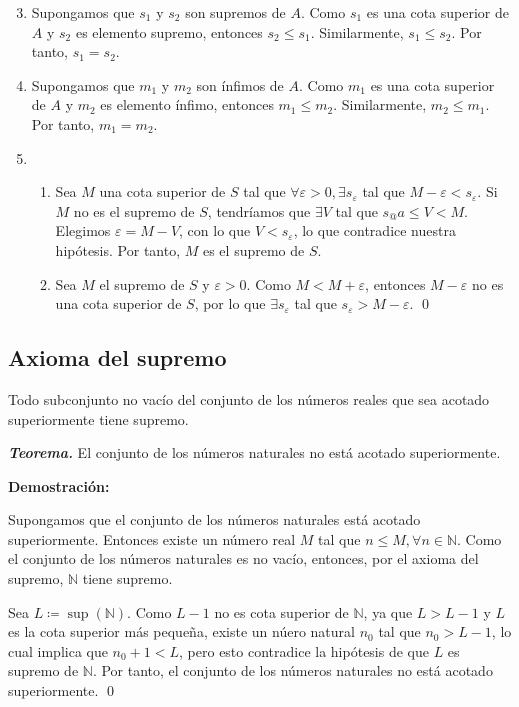 \documentclass[11pt]{article}
\newcommand{\N}{\mathbb{N}}
\let\epsilon\varepsilon
\begin{document}
\begin{enumerate}[label=\arabic*.]\setcounter{enumi}{2}
    \item Supongamos que $s_1$ y $s_2$ son supremos de $A$. Como $s_1$ es una cota superior de $A$ y $s_2$ es elemento supremo, entonces $s_2\leq s_1$. Similarmente, $s_1\leq s_2$. Por tanto, $s_1=s_2$.
    \item Supongamos que $m_1$ y $m_2$ son ínfimos de $A$. Como $m_1$ es una cota superior de $A$ y $m_2$ es elemento ínfimo, entonces $m_1\leq m_2$. Similarmente, $m_2\leq m_1$. Por tanto, $m_1=m_2$.
    \item \begin{enumerate}[label=\roman*)]
        \item Sea $M$ una cota superior de $S$ tal que $\forall \epsilon>0, \exists s_{\epsilon}$ tal que $M-\epsilon<s_{\epsilon}$. Si $M$ no es el supremo de $S$, tendríamos que $\exists V$ tal que $s_@a \leq V < M$. Elegimos $\epsilon = M-V$, con lo que $V<s_{\epsilon}$, lo que contradice nuestra hipótesis. Por tanto, $M$ es el supremo de $S$.
        \item Sea $M$ el supremo de $S$ y $\epsilon>0$. Como $M<M+\epsilon$, entonces $M-\epsilon$ no es una cota superior de $S$, por lo que $\exists s_\epsilon$ tal que $s_\epsilon>M-\epsilon$. \qed
    \end{enumerate}
\end{enumerate}

\subsection*{Axioma del supremo}

Todo subconjunto no vacío del conjunto de los números reales que sea acotado superiormente tiene supremo.

\textbf{\textit{Teorema.}} El conjunto de los números naturales no está acotado superiormente.

\textbf{Demostración:}

Supongamos que el conjunto de los números naturales está acotado superiormente. Entonces existe un número real $M$ tal que $n\leq M, \forall n\in \N$. Como el conjunto de los números naturales es no vacío, entonces, por el axioma del supremo, $\N$ tiene supremo.

Sea $L\coloneqq \sup{(\N)}$. Como $L-1$ no es cota superior de $\N$, ya que $L>L-1$ y $L$ es la cota superior más pequeña, existe un núero natural $n_0$ tal que $n_0>L-1$, lo cual implica que $n_0+1<L$, pero esto contradice la hipótesis	de que $L$ es supremo de $\N$. Por tanto, el conjunto de los números naturales no está acotado superiormente. \qed
\end{document}

